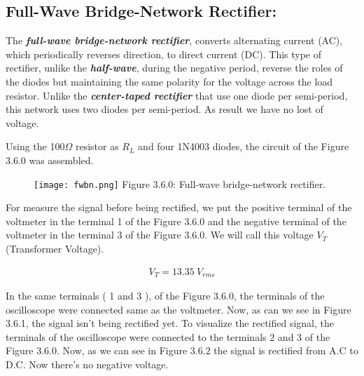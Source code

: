 \subsection{Full-Wave Bridge-Network Rectifier:}

The {\bfseries\itshape full-wave bridge-network rectifier}, converts alternating current (AC), which periodically reverses direction, to direct current (DC). This type of rectifier, unlike the {\bfseries\itshape half-wave}, during the negative period, reverse the roles of the diodes but maintaining the same polarity for the voltage across the load resistor. Unlike the {\bfseries\itshape center-taped rectifier} that use one diode per semi-period, this network uses two diodes per semi-period. As result we have no lost of voltage. \hfill \break 

Using the 100$\Omega$ resistor as $R_{L}$ and four 1N4003 diodes, the circuit of the Figure 3.6.0 was assembled. 

\begin{figure}[H]
\texttt{[image: fwbn.png]}
\centering \linebreak \linebreak Figure 3.6.0: Full-wave bridge-network rectifier.
\end{figure}

For measure the signal before being rectified, we put the positive terminal of the voltmeter in the terminal 1 of the Figure 3.6.0 and the negative terminal of the voltmeter in the terminal 3 of the Figure 3.6.0. We will call this voltage $V_{T}$ (Transformer Voltage).

\begin{ceqn}
\begin{align}
V_{T} = 13.35\ V_{rms}
\end{align}
\end{ceqn}

{\bfseries\itshape\color{OliveGreen}{Observation:}} {\bfseries\itshape{}} \hfill \break

In the same terminals ( 1 and 3 ), of the Figure 3.6.0, the terminals of the oscilloscope were connected same as the voltmeter. Now, as can we see in Figure 3.6.1, the signal isn't being rectified yet. To visualize the rectified signal, the terminals of the oscilloscope were connected to the terminals 2 and 3 of the Figure 3.6.0. Now, as we can see in Figure 3.6.2 the signal is rectified from A.C to D.C. Now there's no negative voltage.


